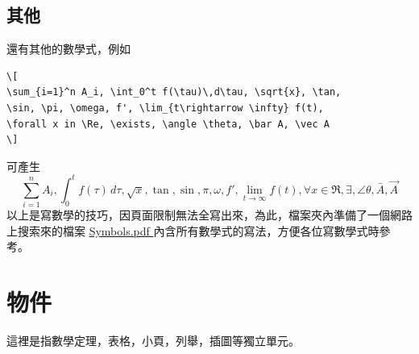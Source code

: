 \subsection{其他}
還有其他的數學式，例如\\
\begin{Verbatim}[frame=single,firstline=1,label=Various math forms]
\[
\sum_{i=1}^n A_i, \int_0^t f(\tau)\,d\tau, \sqrt{x}, \tan, 
\sin, \pi, \omega, f', \lim_{t\rightarrow \infty} f(t),
\forall x in \Re, \exists, \angle \theta, \bar A, \vec A
\]
\end{Verbatim}
可產生   
\[
\sum_{i=1}^n A_i,  \int_0^t f(\tau)\,d\tau, \sqrt{x}, \tan, \sin, \pi, \omega, f',
\lim_{t\rightarrow \infty} f(t),
\forall x \in \Re, \exists, \angle \theta, \bar A, \vec A
\]
以上是寫數學的技巧，因頁面限制無法全寫出來，為此，檔案夾內準備了一個網路上搜索來的檔案
\href{./Symbols.pdf}{ Symbols.pdf }內含所有數學式的寫法，方便各位寫數學式時參考。


\section{物件}
這裡是指數學定理，表格，小頁，列舉，插圖等獨立單元。
